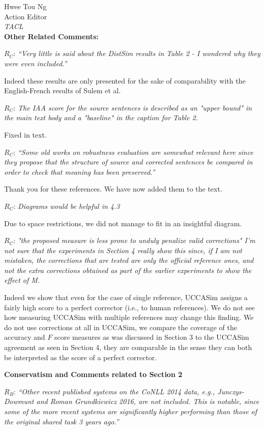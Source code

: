 \documentclass[11pt,letterpaper]{letter}
\newcommand{\lcmod}[1]{{\color{blue}#1}}
\begin{document}
\begin{letter}{%
Hwee Tou Ng\\
Action Editor\\
{\em TACL}\\
}
\vspace{.5cm}
{\large\bf Other Related Comments:}
	
$R_C$: \emph{``Very little is said about the DistSim results in Table 2 - I wondered why
	they were even included.''}
	
Indeed these results are only presented for the sake of comparability with the English-French results of Sulem et al.
	
	\lcmod{
$R_C$: \emph{The IAA score for the source sentences is described as an "upper bound" in
	the main text body and a "baseline" in the caption for Table 2.}

Fixed in text.
	}
	
$R_C$: \emph{``Some old works on robustness evaluation are somewhat relevant here since
	they propose that the structure of source and corrected sentences be
	compared in order to check that meaning has been preserved.''}
	
Thank you for these references. We have now added them to the text.

\lcmod{
	$R_C$: \emph{Diagrams would be helpful in 4.3}
	
	Due to space restrictions, we did not manage to fit in an insightful diagram.
	
	$R_C$: \emph{"the proposed measure is less prone to unduly penalize valid corrections"
I'm not sure that the experiments in Section 4 really show this since, if I
am not mistaken, the corrections that are tested are only the official
reference ones, and not the extra corrections obtained as part of the
earlier experiments to show the effect of M.}

Indeed we show that even for the case of single reference, UCCASim assigns a fairly high score to a perfect corrector (i.e., to human references). We do not see how measuring UCCASim with multiple references may change this finding.
We do not use corrections at all in UCCASim, we compare the coverage of the accuracy and $F$ score measures as was discussed in Section 3 to the UCCASim agreement as seen in Section 4, they are comparable in the sense they can both be interpreted as the score of a perfect corrector. 
}
{\large\bf Conservatism and Comments related to Section 2}

$R_B$: \emph{``Other recent published systems on the CoNLL 2014 data, e.g., Junczys-Dowmunt
	and Roman Grundkiewicz 2016, are not included. This is notable, since some
	of the more recent systems are significantly higher performing than those of
	the original shared task 3 years ago.''}
	

\end{letter}
\end{document}
